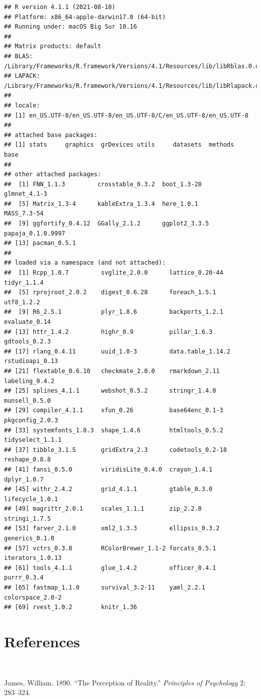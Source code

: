 \documentclass[
  11pt,
]{article}
\newlength{\cslhangindent}
\newlength{\cslentryspacingunit} %
\newenvironment{CSLReferences}[2] %
 {%
  \setlength{\parindent}{0pt}
  \ifodd #1
  \let\oldpar\par
  \def\par{\hangindent=\cslhangindent\oldpar}
  \fi
  \setlength{\parskip}{#2\cslentryspacingunit}
 }%
 {}
\begin{document}
\begin{verbatim}
## R version 4.1.1 (2021-08-10)
## Platform: x86_64-apple-darwin17.0 (64-bit)
## Running under: macOS Big Sur 10.16
## 
## Matrix products: default
## BLAS:   /Library/Frameworks/R.framework/Versions/4.1/Resources/lib/libRblas.0.dylib
## LAPACK: /Library/Frameworks/R.framework/Versions/4.1/Resources/lib/libRlapack.dylib
## 
## locale:
## [1] en_US.UTF-8/en_US.UTF-8/en_US.UTF-8/C/en_US.UTF-8/en_US.UTF-8
## 
## attached base packages:
## [1] stats     graphics  grDevices utils     datasets  methods   base     
## 
## other attached packages:
##  [1] FNN_1.1.3         crosstable_0.3.2  boot_1.3-28       glmnet_4.1-3     
##  [5] Matrix_1.3-4      kableExtra_1.3.4  here_1.0.1        MASS_7.3-54      
##  [9] ggfortify_0.4.12  GGally_2.1.2      ggplot2_3.3.5     papaja_0.1.0.9997
## [13] pacman_0.5.1     
## 
## loaded via a namespace (and not attached):
##  [1] Rcpp_1.0.7         svglite_2.0.0      lattice_0.20-44    tidyr_1.1.4       
##  [5] rprojroot_2.0.2    digest_0.6.28      foreach_1.5.1      utf8_1.2.2        
##  [9] R6_2.5.1           plyr_1.8.6         backports_1.2.1    evaluate_0.14     
## [13] httr_1.4.2         highr_0.9          pillar_1.6.3       gdtools_0.2.3     
## [17] rlang_0.4.11       uuid_1.0-3         data.table_1.14.2  rstudioapi_0.13   
## [21] flextable_0.6.10   checkmate_2.0.0    rmarkdown_2.11     labeling_0.4.2    
## [25] splines_4.1.1      webshot_0.5.2      stringr_1.4.0      munsell_0.5.0     
## [29] compiler_4.1.1     xfun_0.26          base64enc_0.1-3    pkgconfig_2.0.3   
## [33] systemfonts_1.0.3  shape_1.4.6        htmltools_0.5.2    tidyselect_1.1.1  
## [37] tibble_3.1.5       gridExtra_2.3      codetools_0.2-18   reshape_0.8.8     
## [41] fansi_0.5.0        viridisLite_0.4.0  crayon_1.4.1       dplyr_1.0.7       
## [45] withr_2.4.2        grid_4.1.1         gtable_0.3.0       lifecycle_1.0.1   
## [49] magrittr_2.0.1     scales_1.1.1       zip_2.2.0          stringi_1.7.5     
## [53] farver_2.1.0       xml2_1.3.3         ellipsis_0.3.2     generics_0.1.0    
## [57] vctrs_0.3.8        RColorBrewer_1.1-2 forcats_0.5.1      iterators_1.0.13  
## [61] tools_4.1.1        glue_1.4.2         officer_0.4.1      purrr_0.3.4       
## [65] fastmap_1.1.0      survival_3.2-11    yaml_2.2.1         colorspace_2.0-2  
## [69] rvest_1.0.2        knitr_1.36
\end{verbatim}

\hypertarget{references-1}{%
\section{References}\label{references-1}}

\(~\) \(~\)

\hypertarget{refs}{}
\begin{CSLReferences}{1}{0}
\leavevmode{}%
James, William. 1890. {``The Perception of Reality.''} \emph{Principles
of Psychology} 2: 283--324.

\end{CSLReferences}
\end{document}
